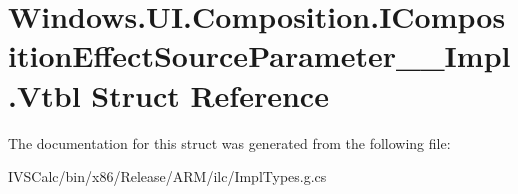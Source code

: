 \hypertarget{struct_windows_1_1_u_i_1_1_composition_1_1_i_composition_effect_source_parameter_____impl_1_1_vtbl}{}\section{Windows.\+U\+I.\+Composition.\+I\+Composition\+Effect\+Source\+Parameter\+\_\+\+\_\+\+Impl.\+Vtbl Struct Reference}
\label{struct_windows_1_1_u_i_1_1_composition_1_1_i_composition_effect_source_parameter_____impl_1_1_vtbl}


The documentation for this struct was generated from the following file\+:\begin{DoxyCompactItemize}
\item 
I\+V\+S\+Calc/bin/x86/\+Release/\+A\+R\+M/ilc/Impl\+Types.\+g.\+cs\end{DoxyCompactItemize}
